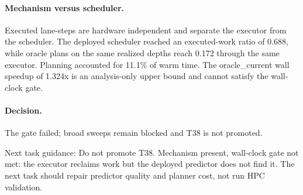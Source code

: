 \paragraph{Mechanism versus scheduler.}
Executed lane-steps are hardware independent and separate the executor from the scheduler. The deployed scheduler reached an executed-work ratio of 0.688, while oracle plans on the same realized depths reach 0.172 through the same executor.
Planning accounted for 11.1\% of warm time.
The oracle\_current wall speedup of 1.324x is an analysis-only upper bound and cannot satisfy the wall-clock gate.

\paragraph{Decision.}
The gate failed; broad sweeps remain blocked and T38 is not promoted.

Next task guidance: Do not promote T38. Mechanism present, wall-clock gate not met: the executor reclaims work but the deployed predictor does not find it. The next task should repair predictor quality and planner cost, not run HPC validation.
